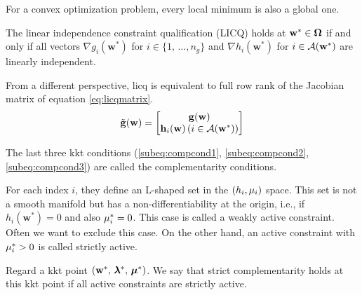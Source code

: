 \begin{theorem}
For a convex optimization problem, every local minimum is also a global one.
\label{theorem:localimplesglobalconvex}
\end{theorem}

\begin{definition}
The linear independence constraint qualification (LICQ) holds at $\mathbf{w}^* \in \feasibleSet$ if and only if all vectors $\nabla g_i(\mathbf{w}^*)$ for $i \in \{1,\,\ldots,n_g\}$ and $\nabla h_i(\mathbf{w}^*)$ for $i \in \mathcal{A}(\mathbf{w}^*)$ are linearly independent.
\label{def:licq}
\end{definition}

From a different perspective, \acrshort{licq} is equivalent to full row rank of the Jacobian matrix of equation \ref{eq:licqmatrix}.
\begin{equation}
\tilde{\mathbf{g}}(\mathbf{w}) = \begin{bmatrix}
\mathbf{g}(\mathbf{w})\\
\mathbf{h}_i(\mathbf{w}) \, (i \in \mathcal{A}(\mathbf{w}^*))
\end{bmatrix}
\label{eq:licqmatrix}
\end{equation}

\begin{definition}
The last three \acrshort{kkt} conditions (\ref{subeq:compcond1}, \ref{subeq:compcond2}, \ref{subeq:compcond3}) are called the complementarity conditions.
\end{definition}

For each index $i$, they define an L-shaped set in the $(h_i, \mu_i)$ space. This set is not a smooth manifold but has a non-differentiability at the origin, i.e., if $h_i(\mathbf{w}^*)=0$ and also $\mu_i^*=0$. This case is called a weakly active constraint. Often we want to exclude this case. On the other hand, an active constraint with $\mu_i^*>0$ is called strictly active.

\begin{definition}
Regard a \acrshort{kkt} point $\left(\mathbf{w}^*,\,\bm{\gmultiplier}^*,\,\bm{\hmultiplier}^*\right)$. We say that strict complementarity holds at this \acrshort{kkt} point if all active constraints are strictly active.
\label{def:strictcomplementarity}
\end{definition}

